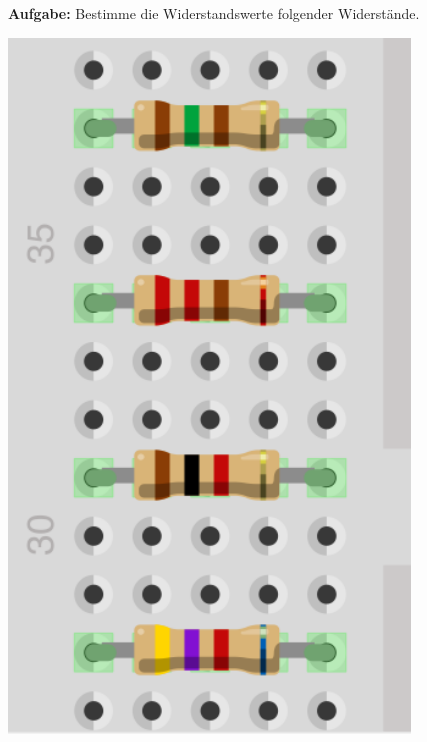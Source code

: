 \textbf{Aufgabe:} Bestimme die Widerstandswerte folgender Widerstände. \\[0.2cm]
\begin{minipage}{0.3\textwidth}
\includegraphics[width=0.8\textwidth]{Anhang/Bilder/widerstaede}
\end{minipage}

